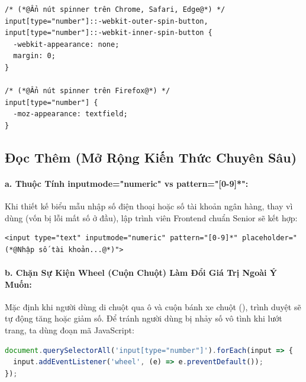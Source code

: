 \begin{codeWindow}
\begin{lstlisting}[language=HTML5]
/* (*@Ẩn nút spinner trên Chrome, Safari, Edge@*) */
input[type="number"]::-webkit-outer-spin-button,
input[type="number"]::-webkit-inner-spin-button {
  -webkit-appearance: none;
  margin: 0;
}

/* (*@Ẩn nút spinner trên Firefox@*) */
input[type="number"] {
  -moz-appearance: textfield;
}
\end{lstlisting}
\end{codeWindow}

\subsection{Đọc Thêm (Mở Rộng Kiến Thức Chuyên Sâu)}
\label{subsec:number_advanced_readmore}

\paragraph{a. Thuộc Tính inputmode="numeric" vs pattern="[0-9]*":}
Khi thiết kế biểu mẫu nhập số điện thoại hoặc số tài khoản ngân hàng, thay vì dùng  (vốn bị lỗi mất số  ở đầu), lập trình viên Frontend chuẩn Senior sẽ kết hợp:
\begin{codeWindow}
\begin{lstlisting}[language=HTML5]
<input type="text" inputmode="numeric" pattern="[0-9]*" placeholder="(*@Nhập số tài khoản...@*)">
\end{lstlisting}
\end{codeWindow}

\paragraph{b. Chặn Sự Kiện Wheel (Cuộn Chuột) Làm Đổi Giá Trị Ngoài Ý Muốn:}
Mặc định khi người dùng di chuột qua ô  và cuộn bánh xe chuột (), trình duyệt sẽ tự động tăng hoặc giảm số. Để tránh người dùng bị nhảy số vô tình khi lướt trang, ta dùng đoạn mã JavaScript:

\begin{codeWindow}[Chặn cuộn chuột đổi số trên input type="number"]
\begin{lstlisting}[language=JavaScript]
document.querySelectorAll('input[type="number"]').forEach(input => {
  input.addEventListener('wheel', (e) => e.preventDefault());
});
\end{lstlisting}
\end{codeWindow}

